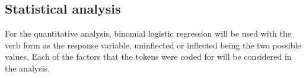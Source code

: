 \documentclass{article}
\begin{document}
    \subsection{Statistical analysis}
      For the quantitative analysis, binomial logistic regression will be used with the verb form as the response variable, uninflected or inflected being the two possible values.
      Each of the factors that the tokens were coded for will be considered in the analysis.

    \printbibliography
\end{document}
